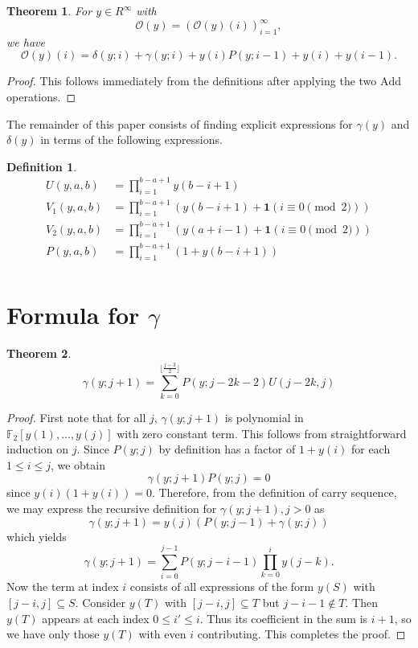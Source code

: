 \documentclass[11pt, oneside]{article}   	%
\newtheorem{theorem}{Theorem}
\newtheorem{definition}{Definition}
\begin{document}
\begin{theorem}
For $y \in R^\infty$ with 
\[
\mathscr{O}(y) = (\mathscr{O}(y)(i))_{i=1}^\infty,
\]
we have 
\[
\mathscr{O}(y)(i) = \delta(y; i)+ \gamma(y;i) + y(i) P(y; i-1) + y(i) + y(i-1). 
\] 
\end{theorem}
\begin{proof}
This follows immediately from the definitions after applying the two $\mathrm{Add}$ operations.  
\end{proof}

The remainder of this paper consists of finding explicit expressions for $\gamma(y)$ and $\delta(y)$ in terms of the following expressions.

\begin{definition} 

\begin{align*}
U(y, a, b) &= \prod_{i=1}^{b-a+1}y(b-i+1) \\
V_1(y, a, b) &= \prod_{i=1}^{b-a+1}( y(b-i+1)+ \mathbf{1}(i \equiv 0 \pmod 2)) \\
V_2(y,a,b) &= \prod_{i=1}^{b-a+1}( y(a+i-1)+ \mathbf{1}(i \equiv 0 \pmod 2)) \\
P(y, a, b) &= \prod_{i=1}^{b-a+1}( 1+y(b-i+1)) \\
\end{align*}
\end{definition} 


\section{Formula for $\gamma$}

\begin{theorem} \label{t gamma sum}
\[
\gamma(y;j+1) = \sum_{k=0}^{\lfloor \frac{j-3}{2} \rfloor } P(y;j-2k-2) U(j-2k,j) %
 \]
\end{theorem}
\begin{proof}
First note that for all $j$, $\gamma(y;j+1)$ is polynomial in $\mathbb{F}_2[y(1), \ldots, y(j)]$ with zero constant term. This follows from straightforward induction on $j$.  
 Since $P(y;j)$ by definition has a factor of $1+y(i)$ for each $1 \leq i \leq j$, we obtain  
 \[
 \gamma(y;j+1) P(y;j)=0 
 \]
 since $y(i)(1+y(i))=0$. Therefore, from the definition of carry sequence, we may express the recursive definition for $\gamma(y;j+1), j>0$ as
\[
\gamma(y;j+1) = y(j)(P(y;j-1)+ \gamma(y;j))
\]
which yields 
\[
\gamma(y;j+1) = \sum_{i=0}^{j-1} P(y;j-i-1) \prod_{k=0}^i y(j-k).
\]
Now the term at index $i$ consists of all expressions of the form $y(S)$ with $[j-i,j] \subseteq S$. Consider $y(T)$ with $[j-i,j] \subseteq T$ but $j-i-1 \notin T$. Then $y(T)$ appears at each index $0 \leq  i' \leq i$. Thus its coefficient in the sum is $i+1$, so we have only those $y(T)$ with even $i$ contributing. This completes the proof.    
\end{proof}
\end{document}
